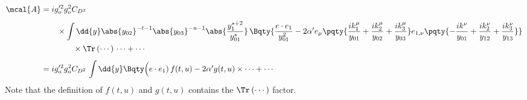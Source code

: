 \documentclass[a4paper,10pt]{article}
\begin{document}
\begin{enumerate}
	\begin{equation}
	\begin{aligned}
		\mcal{A}
		&= ig_o'^2 g_o^2 C_{D^2}\,
			\\[1ex] & \qquad
			\times \int \dd{y}
				\abs{y_{02}}^{-t-1}
				\abs{y_{03}}^{-u-1}
				\abs{\frac{y_1^{s+2}}{y_{01}^s}}\,
				\Bqty{
					\frac{e\cdot e_1}{y_{01}^2}
					- 2\alpha' e_\mu \pqty{
						\frac{ik_1^\mu}{y_{01}}
						+ \frac{ik_2^\mu}{y_{02}}
						+ \frac{ik_3^\mu}{y_{03}}
					}
					e_{1,\nu} \pqty{
						- \frac{ik^\nu}{y_{01}}
						+ \frac{ik_2^\nu}{y_{12}}
						+ \frac{ik_3^\nu}{y_{13}}
					}
			}
			\\ & \qquad\qquad
			\times \Tr\,(\cdots)\,\cdots + \cdots
	\\[1ex]
		&= ig_o'^2 g_o^2 C_{D^2}\,
			\int \dd{y} \Bqty\Big{
				(e\cdot e_1)\,f(t,u)
				- 2\alpha' g(t,u)
			} \times \cdots + \cdots
	\end{aligned}
	\end{equation}
	Note that the definition of $f(t,u)$ and $g(t,u)$ contains the $\Tr\,(\cdots)$ factor. 
	

\end{enumerate}
\end{document}
